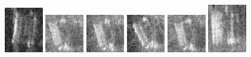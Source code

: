 \begin{figure}
    \includegraphics[width=0.15\textwidth]{chapters/images/dataset/all-class-images/can/can-152.jpg}
    \includegraphics[width=0.15\textwidth]{chapters/images/dataset/all-class-images/can/can-257.jpg}
    \includegraphics[width=0.15\textwidth]{chapters/images/dataset/all-class-images/can/can-285.jpg}
    \includegraphics[width=0.15\textwidth]{chapters/images/dataset/all-class-images/can/can-207.jpg}
    \includegraphics[width=0.15\textwidth]{chapters/images/dataset/all-class-images/can/can-249.jpg}
    \includegraphics[width=0.15\textwidth]{chapters/images/dataset/all-class-images/can/can-351.jpg}
    

\end{figure}
